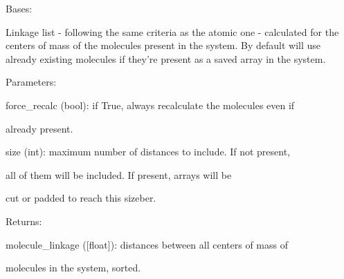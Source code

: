 \documentclass[letterpaper,10pt,english]{sphinxmanual}
\begin{document}
\begin{fulllineitems}
\label{doctree/soprano.properties.linkage.linkage:soprano.properties.linkage.linkage.MoleculeCOMLinkage}
Bases: {\hyperref[doctree/soprano.properties.atomsproperty:soprano.properties.atomsproperty.AtomsProperty]{}}

Linkage list - following the same criteria as the atomic one - calculated
for the centers of mass of the molecules present in the system. By default
will use already existing molecules if they're present as a saved array in
the system.

\begin{DUlineblock}{0em}
\item[] Parameters:
\item[]
\begin{DUlineblock}{\DUlineblockindent}
\item[] force\_recalc (bool): if True, always recalculate the molecules even if
\item[]
\begin{DUlineblock}{\DUlineblockindent}
\item[] already present.
\end{DUlineblock}
\item[] size (int): maximum number of distances to include. If not present,
\item[]
\begin{DUlineblock}{\DUlineblockindent}
\item[] all of them will be included. If present, arrays will be
\item[] cut or padded to reach this sizeber.
\end{DUlineblock}
\end{DUlineblock}
\end{DUlineblock}

\begin{DUlineblock}{0em}
\item[] Returns:
\item[]
\begin{DUlineblock}{\DUlineblockindent}
\item[] molecule\_linkage ({[}float{]}): distances between all centers of mass of
\item[]
\begin{DUlineblock}{\DUlineblockindent}
\item[] molecules in the system, sorted.
\end{DUlineblock}
\end{DUlineblock}
\end{DUlineblock}


\end{fulllineitems}
\end{document}
